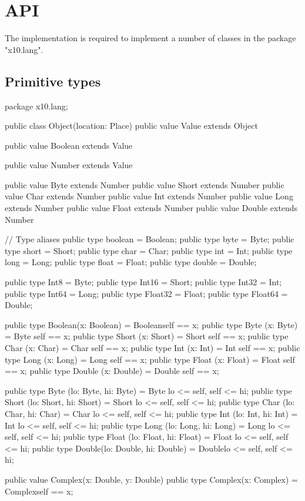 \chapter{API}\label{XtenAPI}

The \Xten{} implementation is required to implement a number of
classes in the package \xcd"x10.lang".


\section{Primitive types}


\begin{xten}
package x10.lang;

public class Object(location: Place) { }
public value Value extends Object { }

public value Boolean extends Value { }

public value Number  extends Value { }

public value Byte    extends Number { }
public value Short   extends Number { }
public value Char    extends Number { }
public value Int     extends Number { }
public value Long    extends Number { }
public value Float   extends Number { }
public value Double  extends Number { }

// Type aliases
public type boolean = Boolean;
public type byte = Byte;
public type short = Short;
public type char = Char;
public type int = Int;
public type long = Long;
public type float = Float;
public type double = Double;

public type Int8    = Byte;
public type Int16   = Short;
public type Int32   = Int;
public type Int64   = Long;
public type Float32 = Float;
public type Float64 = Double;

public type Boolean(x: Boolean) = Boolean{self == x};
public type Byte   (x: Byte)    = Byte   {self == x};
public type Short  (x: Short)   = Short  {self == x};
public type Char   (x: Char)    = Char   {self == x};
public type Int    (x: Int)     = Int    {self == x};
public type Long   (x: Long)    = Long   {self == x};
public type Float  (x: Float)   = Float  {self == x};
public type Double (x: Double)  = Double {self == x};

public type Byte  (lo: Byte,   hi: Byte)  
          = Byte  {lo <= self, self <= hi};
public type Short (lo: Short,  hi: Short) 
          = Short {lo <= self, self <= hi};
public type Char  (lo: Char,   hi: Char)  
          = Char  {lo <= self, self <= hi};
public type Int   (lo: Int,    hi: Int)   
          = Int   {lo <= self, self <= hi};
public type Long  (lo: Long,   hi: Long)  
          = Long  {lo <= self, self <= hi};
public type Float (lo: Float,  hi: Float) 
          = Float {lo <= self, self <= hi};
public type Double(lo: Double, hi: Double)
          = Double{lo <= self, self <= hi};

public value Complex(x: Double, y: Double) { }
public type Complex(x: Complex) = Complex{self == x};
\end{xten}

